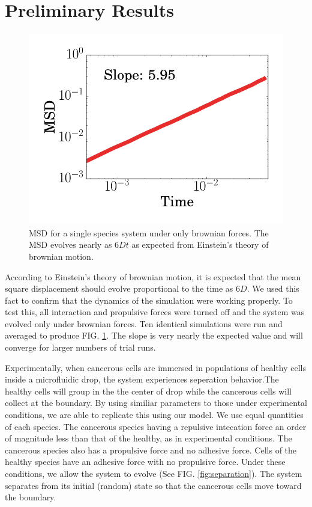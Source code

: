 \documentclass[aps,prb,twocolumn,groupedaddress,nofootinbib,floatfix]{revtex4}
\begin{document}
\section*{Preliminary Results}
\begin{figure}
  \includegraphics[width=\columnwidth]{brownianMSD.png}
  \caption[brownianMSD]
    {MSD for a single species system under only brownian forces. The MSD
      evolves nearly as $6Dt$ as expected from Einstein's theory of brownian motion.}
  \label{fig:brownianMSD}
\end{figure}

According to Einstein's theory of brownian motion, it is expected that the mean
square displacement should evolve proportional to the time as $6D$. We used this fact to confirm that the dynamics of the simulation were working properly. To test this, all interaction and propulsive forces were turned off and the system was evolved only under brownian forces. Ten identical simulations were run and averaged to produce FIG. \ref{fig:brownianMSD}. The slope is very nearly the expected 
value and will converge for larger numbers of trial runs.

Experimentally, when cancerous cells are immersed in populations of healthy cells
inside a microfluidic drop, the system experiences seperation behavior.The healthy 
cells will group in the the center of drop while the cancerous cells will collect
at the boundary. By using similiar parameters to those under experimental conditions,
we are able to replicate this using our model.
We use equal quantities of each species. The cancerous species having a repulsive
intecation force an order of magnitude less than that of the healthy, as in 
experimental conditions. The cancerous species also has a propulsive force and 
no adhesive force. Cells of the healthy species have an adhesive force with no
propulsive force. Under these conditions, we allow the system to evolve (See
FIG. \ref{fig:separation}). The system separates from its initial (random) state
so that the cancerous cells move toward the boundary.
\end{document}

